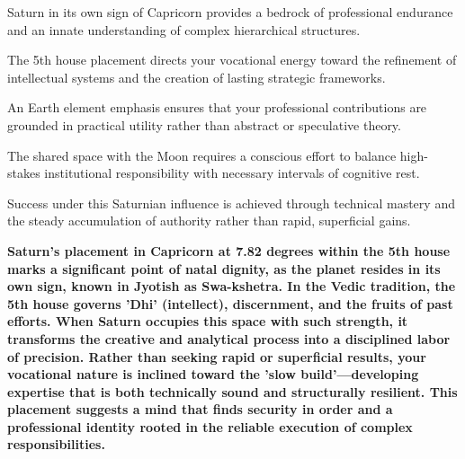 \begin{diamondlist}
  \item {\fontsize{8.5}{12}\selectfont Saturn in its own sign of Capricorn provides a bedrock of professional endurance and an innate understanding of complex hierarchical structures.}
  \item {\fontsize{8.5}{12}\selectfont The 5th house placement directs your vocational energy toward the refinement of intellectual systems and the creation of lasting strategic frameworks.}
  \item {\fontsize{8.5}{12}\selectfont An Earth element emphasis ensures that your professional contributions are grounded in practical utility rather than abstract or speculative theory.}
  \item {\fontsize{8.5}{12}\selectfont The shared space with the Moon requires a conscious effort to balance high-stakes institutional responsibility with necessary intervals of cognitive rest.}
  \item {\fontsize{8.5}{12}\selectfont Success under this Saturnian influence is achieved through technical mastery and the steady accumulation of authority rather than rapid, superficial gains.}
\end{diamondlist}


\label{topic34}

{\fontsize{9.5}{13.8}\selectfont\bfseries\color{DeepSlate} Saturn's placement in Capricorn at 7.82 degrees within the 5th house marks a significant point of natal dignity, as the planet resides in its own sign, known in Jyotish as Swa-kshetra. In the Vedic tradition, the 5th house governs 'Dhi' (intellect), discernment, and the fruits of past efforts. When Saturn occupies this space with such strength, it transforms the creative and analytical process into a disciplined labor of precision. Rather than seeking rapid or superficial results, your vocational nature is inclined toward the 'slow build'---developing expertise that is both technically sound and structurally resilient. This placement suggests a mind that finds security in order and a professional identity rooted in the reliable execution of complex responsibilities.}\par\vspace{2mm}

